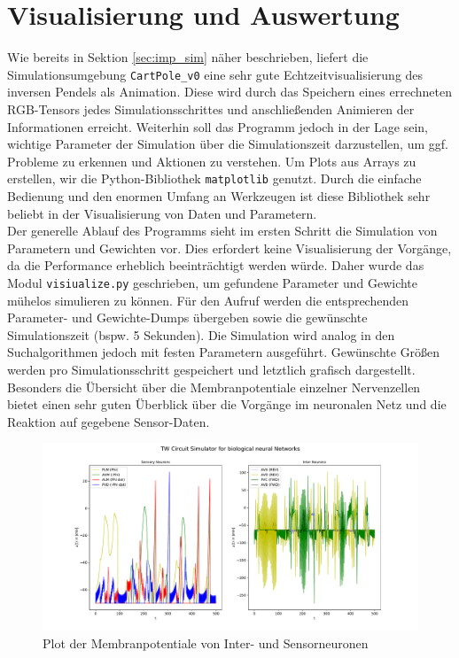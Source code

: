\section{Visualisierung und Auswertung}
\label{sec:imp_vis}
	Wie bereits in Sektion \ref{sec:imp_sim} näher beschrieben, liefert die Simulationsumgebung \texttt{CartPole\_v0} eine sehr gute Echtzeitvisualisierung des inversen Pendels als Animation. Diese wird durch das Speichern eines errechneten RGB-Tensors jedes Simulationsschrittes und anschließenden Animieren der Informationen erreicht. Weiterhin soll das Programm jedoch in der Lage sein, wichtige Parameter der Simulation über die Simulationszeit darzustellen, um ggf. Probleme zu erkennen und Aktionen zu verstehen. Um Plots aus Arrays zu erstellen, wir die Python-Bibliothek \texttt{matplotlib} \cite{Hunter2007} genutzt. Durch die einfache Bedienung und den enormen Umfang an Werkzeugen ist diese Bibliothek sehr beliebt in der Visualisierung von Daten und Parametern.\\
	Der generelle Ablauf des Programms sieht im ersten Schritt die Simulation von Parametern und Gewichten vor. Dies erfordert keine Visualisierung der Vorgänge, da die Performance erheblich beeinträchtigt werden würde. Daher wurde das Modul \texttt{visiualize.py} geschrieben, um gefundene Parameter und Gewichte mühelos simulieren zu können. Für den Aufruf werden die entsprechenden Parameter- und Gewichte-Dumps übergeben sowie die gewünschte Simulationszeit (bspw. 5 Sekunden). Die Simulation wird analog in den Suchalgorithmen jedoch mit festen Parametern ausgeführt. Gewünschte Größen werden pro Simulationsschritt gespeichert und letztlich grafisch dargestellt. Besonders die Übersicht über die Membranpotentiale einzelner Nervenzellen bietet einen sehr guten Überblick über die Vorgänge im neuronalen Netz und die Reaktion auf gegebene Sensor-Daten.
	\begin{figure}[H] %
		\centering
		\includegraphics[width=16cm]{figures/chap_implement/plot_membranpot.pdf}
		\caption{Plot der Membranpotentiale von Inter- und Sensorneuronen}
		\label{fig:plot_membr}
	\end{figure}
